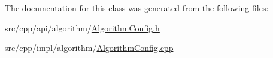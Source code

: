 The documentation for this class was generated from the following files:\begin{DoxyCompactItemize}
\item 
src/cpp/api/algorithm/\hyperlink{AlgorithmConfig_8h}{AlgorithmConfig.h}\item 
src/cpp/impl/algorithm/\hyperlink{AlgorithmConfig_8cpp}{AlgorithmConfig.cpp}\end{DoxyCompactItemize}
